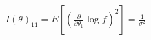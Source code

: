 \documentclass[preview]{standalone}
\begin{document}
\begin{align*}
I(\theta)_{11} = E\left[\left(\frac{\partial}{\partial\theta_1} \log f\right)^2\right] = \frac{1}{\sigma^2}
\end{align*}
\end{document}
